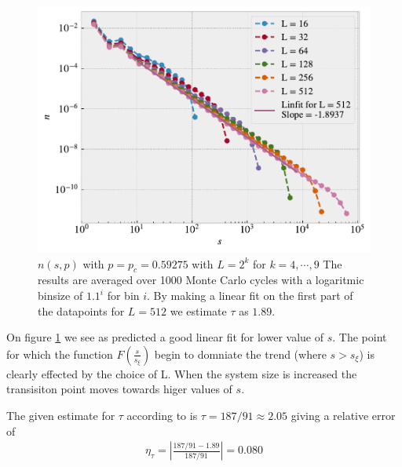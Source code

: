 \documentclass[reprint, amsmath, amssymb, aps]{revtex4-2}
\begin{document}
\begin{figure}[H]
  \includegraphics[width=\linewidth]{figures/g.pdf}
  \caption{$n(s,p)$ with $p = p_c = 0.59275$ with $L = 2^k$ for $k = 4, \cdots, 9$ The results are averaged over 1000 Monte Carlo cycles with a logaritmic binsize of $1.1^i$ for bin $i$. By making a linear fit on the first part of the datapoints for $L = 512$ we estimate $\tau$ as $1.89$.}
  \label{fig:g}
\end{figure}
On figure \ref{fig:g} we see as predicted a good linear fit for lower value of $s$. The point for which the function $F\left(\frac{s}{s_\xi}\right)$ begin to domniate the trend (where $s > s_\xi$) is clearly effected by the choice of L. When the system size is increased the transisiton point moves towards higer values of $s$. \par
The given estimate for $\tau$ according to \cite{textbook} is $\tau = 187/91 \approx 2.05$ giving a relative error of
\begin{align*}
  \eta_\tau= \left|\frac{187/91 - 1.89}{187/91}\right| = 0.080
\end{align*}
%
%
\end{document}

